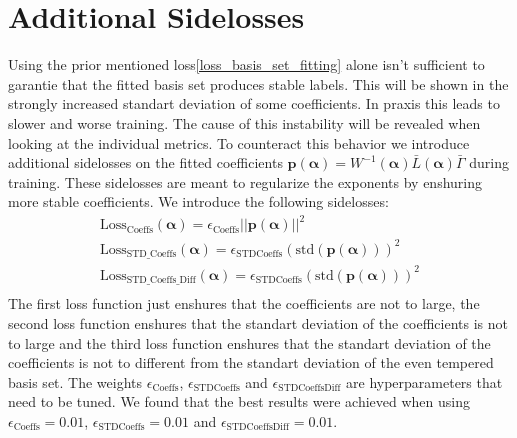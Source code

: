  \section{Additional Sidelosses}
 Using the prior mentioned loss\ref{loss_basis_set_fitting} alone isn't sufficient to garantie that the fitted basis set produces stable labels. This will be shown in the strongly increased standart deviation of some coefficients. In praxis this leads to slower and worse training. The cause of this instability will be revealed when looking at the individual metrics.
 To counteract this behavior we introduce additional sidelosses on the fitted coefficients $\mathbf{p}(\mathbf{\alpha}) = W^{-1}(\mathbf{\alpha}) \bar L(\mathbf{\alpha}) \bar \Gamma$ during training. These sidelosses are meant to regularize the exponents by enshuring more stable coefficients. We introduce the following sidelosses:
 \begin{align}
    \text{Loss}_\text{Coeffs}(\mathbf{\alpha}) = \epsilon_\text{Coeffs}||\mathbf{p}(\mathbf{\alpha})||^2\\
    \text{Loss}_\text{STD\_Coeffs}(\mathbf{\alpha}) = \epsilon_\text{STDCoeffs}\left(\text{std}(\mathbf{p}(\mathbf{\alpha}))\right)^2\\
    \text{Loss}_\text{STD\_Coeffs\_Diff}(\mathbf{\alpha}) = \epsilon_\text{STDCoeffs}\left(\text{std}(\mathbf{p}(\mathbf{\alpha}))\right)^2\\
 \end{align}
The first loss function just enshures that the coefficients are not to large, the second loss function enshures that the standart deviation of the coefficients is not to large and the third loss function enshures that the standart deviation of the coefficients is not to different from the standart deviation of the even tempered basis set. The weights $\epsilon_\text{Coeffs}$, $\epsilon_\text{STDCoeffs}$ and $\epsilon_\text{STDCoeffsDiff}$ are hyperparameters that need to be tuned. We found that the best results were achieved when using $\epsilon_\text{Coeffs} = 0.01$, $\epsilon_\text{STDCoeffs} = 0.01$ and $\epsilon_\text{STDCoeffsDiff} = 0.01$.
